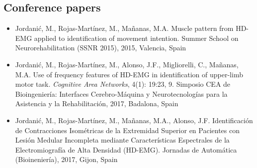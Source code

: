 \subsection{Conference papers}

\begin{itemize}
\item Jordanić, M., Rojas-Martínez, M., Mañanas, M.A. Muscle pattern from HD-EMG applied to identification of movement intention. Summer School on Neurorehabilitation (SSNR 2015), 2015, Valencia, Spain

\item Jordanić, M., Rojas-Martínez, M., Alonso, J.F., Migliorelli, C., Mañanas, M.A.  Use of frequency features of HD-EMG in identification of upper-limb motor task. \textit{Cognitive Area Networks}, 4(1): 19:23, 9. Simposio CEA de Bioingeniería: Interfaces Cerebro-Máquina y Neurotecnologías para la Asistencia y la Rehabilitación, 2017, Badalona, Spain

\item Jordanić, M., Rojas-Martínez, M., Mañanas, M.A., Alonso, J.F. Identificación de Contracciones Isométricas de la Extremidad Superior en Pacientes con Lesión Medular Incompleta mediante Características Espectrales de la Electromiografía de Alta Densidad (HD-EMG). Jornadas de Automática (Bioineniería), 2017, Gijon, Spain

\end{itemize}


